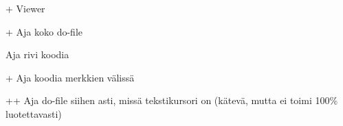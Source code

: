 \documentclass[a4paper,12pt]{scrartcl}
\begin{document}
+ Viewer

\medskip

\keys{\ctrl}+ Aja koko do-file

\keys{\ctrl + \return} Aja rivi koodia

+\keys{\return} Aja koodia merkkien \keys{\{} \keys{\}} välissä

++ Aja do-file siihen asti, missä tekstikursori on (kätevä, mutta ei toimi 100\% luotettavasti)


\end{document}
